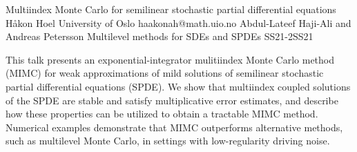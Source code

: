 \begin{talk}
\end{talk}

\begin{talk}
  {Multiindex Monte Carlo for semilinear stochastic partial differential equations}%
  {H{\aa}kon Hoel}%
  {University of Oslo}%
  {haakonah@math.uio.no}%
  {Abdul-Lateef Haji-Ali and Andreas Petersson}%
{Multilevel methods for SDEs and SPDEs}
{}{SS21-2}{SS21}

			
This talk presents an exponential-integrator mulitiindex Monte Carlo method (MIMC) for weak approximations of mild solutions of semilinear stochastic partial differential equations (SPDE). We show that multiindex coupled solutions of the SPDE are stable and satisfy multiplicative error estimates, and describe how these properties can be utilized to obtain a tractable MIMC method. Numerical examples demonstrate that MIMC outperforms alternative methods, such as multilevel Monte Carlo, in settings with low-regularity driving noise.  

\end{talk}


